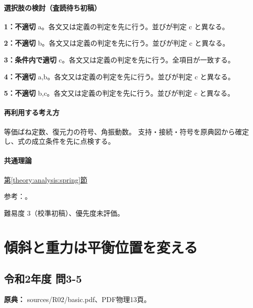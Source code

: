 \paragraph{選択肢の検討（査読待ち初稿）}\mbox{}\par

\noindent\textbf{1：不適切} a。各文又は定義の判定を先に行う。並びが判定 c と異なる。\par

\noindent\textbf{2：不適切} b。各文又は定義の判定を先に行う。並びが判定 c と異なる。\par

\noindent\textbf{3：条件内で適切} c。各文又は定義の判定を先に行う。全項目が一致する。\par

\noindent\textbf{4：不適切} a,b。各文又は定義の判定を先に行う。並びが判定 c と異なる。\par

\noindent\textbf{5：不適切} b,c。各文又は定義の判定を先に行う。並びが判定 c と異なる。\par

\paragraph{再利用する考え方} 等価ばね定数、復元力の符号、角振動数。 支持・接続・符号を原典図から確定し、式の成立条件を先に点検する。

\paragraph{共通理論} \hyperref[theory:analysis:spring]{第\ref*{theory:analysis:spring}節}

\par 参考：\cite{analysis57_shm}。

\par 難易度 3（校準初稿）、優先度未評価。

\section{傾斜と重力は平衡位置を変える}

\subsection{令和2年度 問3-5}
\label{q:r02-reg-basic-3-5}

\noindent\textbf{原典：} sources/R02/basic.pdf、PDF物理13頁。

